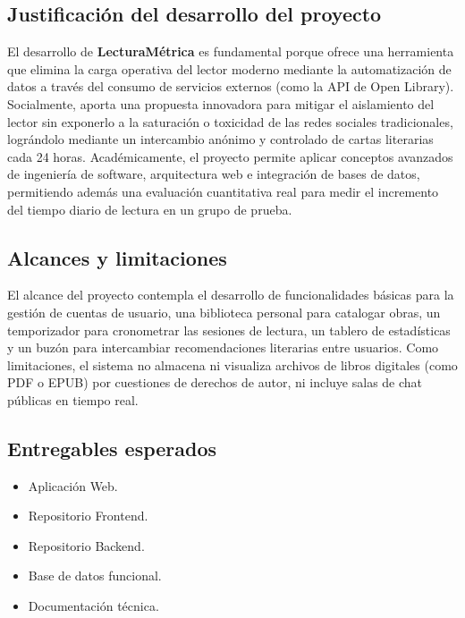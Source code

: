 \documentclass[12pt, atypical, journal]{article}
\begin{document}
\subsection{Justificación del desarrollo del proyecto}
El desarrollo de \textbf{LecturaMétrica} es fundamental porque ofrece una herramienta que elimina la carga operativa del lector moderno mediante la automatización de datos a través del consumo de servicios externos (como la API de Open Library). Socialmente, aporta una propuesta innovadora para mitigar el aislamiento del lector sin exponerlo a la saturación o toxicidad de las redes sociales tradicionales, lográndolo mediante un intercambio anónimo y controlado de cartas literarias cada 24 horas. Académicamente, el proyecto permite aplicar conceptos avanzados de ingeniería de software, arquitectura web e integración de bases de datos, permitiendo además una evaluación cuantitativa real para medir el incremento del tiempo diario de lectura en un grupo de prueba.

\subsection{Alcances y limitaciones}
El alcance del proyecto contempla el desarrollo de funcionalidades básicas para la gestión de cuentas de usuario, una biblioteca personal para catalogar obras, un temporizador para cronometrar las sesiones de lectura, un tablero de estadísticas y un buzón para intercambiar recomendaciones literarias entre usuarios. Como limitaciones, el sistema no almacena ni visualiza archivos de libros digitales (como PDF o EPUB) por cuestiones de derechos de autor, ni incluye salas de chat públicas en tiempo real.

\subsection{Entregables esperados}
\begin{itemize}
    \item Aplicación Web.
    \item Repositorio Frontend.
    \item Repositorio Backend.
    \item Base de datos funcional.
    \item Documentación técnica.
\end{itemize}

\end{document}

